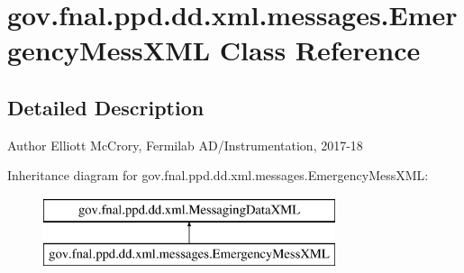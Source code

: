 \hypertarget{classgov_1_1fnal_1_1ppd_1_1dd_1_1xml_1_1messages_1_1EmergencyMessXML}{\section{gov.\-fnal.\-ppd.\-dd.\-xml.\-messages.\-Emergency\-Mess\-X\-M\-L Class Reference}
\label{classgov_1_1fnal_1_1ppd_1_1dd_1_1xml_1_1messages_1_1EmergencyMessXML}
}


\subsection{Detailed Description}
\begin{DoxyAuthor}{Author}
Elliott Mc\-Crory, Fermilab A\-D/\-Instrumentation, 2017-\/18 
\end{DoxyAuthor}
Inheritance diagram for gov.\-fnal.\-ppd.\-dd.\-xml.\-messages.\-Emergency\-Mess\-X\-M\-L\-:\begin{figure}[H]
\begin{center}
\leavevmode
\includegraphics[height=2.000000cm]{classgov_1_1fnal_1_1ppd_1_1dd_1_1xml_1_1messages_1_1EmergencyMessXML}
\end{center}
\end{figure}
